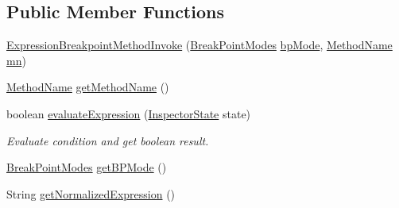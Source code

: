 \subsection*{Public Member Functions}
\begin{DoxyCompactItemize}
\item 
\hyperlink{classgov_1_1nasa_1_1jpf_1_1inspector_1_1server_1_1expression_1_1expressions_1_1_expression_breakpoint_method_invoke_a6ba09584af92bd3329667df61c5b869f}{Expression\+Breakpoint\+Method\+Invoke} (\hyperlink{enumgov_1_1nasa_1_1jpf_1_1inspector_1_1server_1_1breakpoints_1_1_break_point_modes}{Break\+Point\+Modes} \hyperlink{classgov_1_1nasa_1_1jpf_1_1inspector_1_1server_1_1expression_1_1expressions_1_1_expression_breakpoint_method_invoke_a15cf301f710ffb44deab92eaaeda05fc}{bp\+Mode}, \hyperlink{classgov_1_1nasa_1_1jpf_1_1inspector_1_1utils_1_1expressions_1_1_method_name}{Method\+Name} \hyperlink{classgov_1_1nasa_1_1jpf_1_1inspector_1_1server_1_1expression_1_1expressions_1_1_expression_breakpoint_method_invoke_a8a2dddc05a758fabc56ed95897ee1bc3}{mn})
\item 
\hyperlink{classgov_1_1nasa_1_1jpf_1_1inspector_1_1utils_1_1expressions_1_1_method_name}{Method\+Name} \hyperlink{classgov_1_1nasa_1_1jpf_1_1inspector_1_1server_1_1expression_1_1expressions_1_1_expression_breakpoint_method_invoke_a40ac6962794c2968c4c11bd27921b239}{get\+Method\+Name} ()
\item 
boolean \hyperlink{classgov_1_1nasa_1_1jpf_1_1inspector_1_1server_1_1expression_1_1expressions_1_1_expression_breakpoint_method_invoke_ae5d9d2d66f9c33250a58aa87675f8a4e}{evaluate\+Expression} (\hyperlink{interfacegov_1_1nasa_1_1jpf_1_1inspector_1_1server_1_1expression_1_1_inspector_state}{Inspector\+State} state)
\begin{DoxyCompactList}\small\item\em Evaluate condition and get boolean result. \end{DoxyCompactList}\item 
\hyperlink{enumgov_1_1nasa_1_1jpf_1_1inspector_1_1server_1_1breakpoints_1_1_break_point_modes}{Break\+Point\+Modes} \hyperlink{classgov_1_1nasa_1_1jpf_1_1inspector_1_1server_1_1expression_1_1expressions_1_1_expression_breakpoint_method_invoke_ab1b03a2edbdb645b34769e1b8a469e81}{get\+B\+P\+Mode} ()
\item 
String \hyperlink{classgov_1_1nasa_1_1jpf_1_1inspector_1_1server_1_1expression_1_1expressions_1_1_expression_breakpoint_method_invoke_ac116f2f835fd0df2ceb94a90a42cd163}{get\+Normalized\+Expression} ()
\item 

\end{DoxyCompactItemize}
